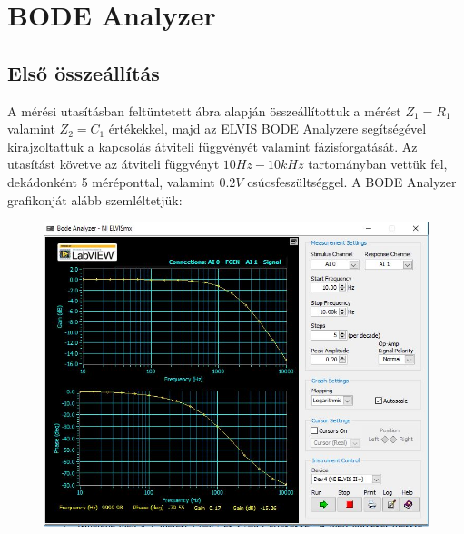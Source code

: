 \documentclass[10pt, conference,a4paper]{ITKproc}
\begin{document}
\section{BODE Analyzer}
\subsection{Első összeállítás}

A mérési utasításban feltüntetett ábra alapján összeállítottuk a mérést $Z_1 = R_1$ valamint $Z_2 = C_1$ értékekkel, majd az ELVIS BODE Analyzere segítségével kirajzoltattuk a kapcsolás átviteli függvényét valamint fázisforgatását. Az utasítást követve az átviteli függvényt $10Hz - 10kHz$ tartományban vettük fel, dekádonként 5 méréponttal, valamint $0.2 V$ csúcsfeszültséggel. A BODE Analyzer grafikonját alább szemléltetjük: 
\begin{figure}[h]
\includegraphics[scale=0.3]{bode_1}
\centering
\end{figure}
\end{document}
